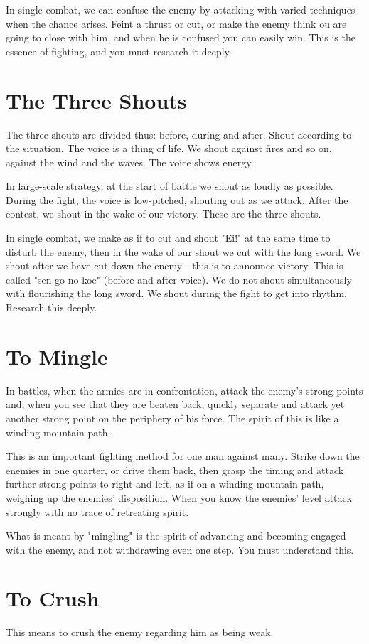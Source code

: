 \documentclass[12pt]{report}
\begin{document}
In single combat, we can confuse the enemy by attacking with varied techniques when the chance arises. Feint a thrust or cut, or make the enemy think ou are going to close with him, and when he is confused you can easily win. This is the essence of fighting, and you must research it deeply.
\section*{The Three Shouts}
The three shouts are divided thus: before, during and after. Shout according to the situation. The voice is a thing of life. We shout against fires and so on, against the wind and the waves. The voice shows energy.

In large-scale strategy, at the start of battle we shout as loudly as possible. During the fight, the voice is low-pitched, shouting out as we attack. After the contest, we shout in the wake of our victory. These are the three shouts.

In single combat, we make as if to cut and shout "Ei!" at the same time to disturb the enemy, then in the wake of our shout we cut with the long sword. We shout after we have cut down the enemy - this is to announce victory. This is called "sen go no koe" (before and after voice). We do not shout simultaneously with flourishing the long sword. We shout during the fight to get into rhythm. Research this deeply.
\section*{To Mingle}
In battles, when the armies are in confrontation, attack the enemy's strong points and, when you see that they are beaten back, quickly separate and attack yet another strong point on the periphery of his force. The spirit of this is like a winding mountain path.

This is an important fighting method for one man against many. Strike down the enemies in one quarter, or drive them back, then grasp the timing and attack further strong points to right and left, as if on a winding mountain path, weighing up the enemies' disposition. When you know the enemies' level attack strongly with no trace of retreating spirit.

What is meant by "mingling" is the spirit of advancing and becoming engaged with the enemy, and not withdrawing even one step. You must understand this.
\section*{To Crush}
This means to crush the enemy regarding him as being weak.
\end{document}

